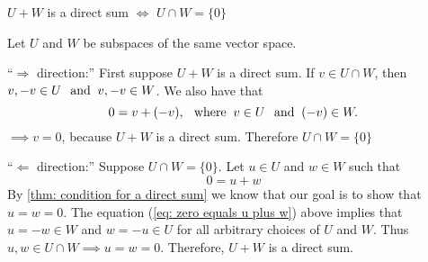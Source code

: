 \setcounter{thm}{45}
\begin{thm} 
  \label{thm: intersection of direct sum of two subscpaces}
  $U+W$ is a direct sum $\iff$ $U \cap W = \{0\}$
\end{thm}
\begin{prf} Let $U$ and $W$ be subspaces of the same vector space.
  \begin{description}
    \item{``$\Rightarrow$ direction:''} First suppose $U+W$ is a direct sum. If $v \in U \cap W$, then $v, -v \in U \;\;\, \text{and}\;\; v, -v \in W$. We also have that
    \begin{equation}
      0 = v + (-v), \;\;\, \text{where}\;\; v\in U \;\;\, \text{and}\;\; (-v) \in W.
    \end{equation}
    $\implies v=0$, because $U+W$  is a direct sum. Therefore $U \cap W = \{0\}$ 
    
    \item{``$\Leftarrow$ direction:''} Suppose $U\cap W = \{0\}$. Let  $u\in U$ and $w \in W$ such that
    \begin{equation}
      \label{eq: zero equals u plus w}
      0 = u+w
    \end{equation}
    By \ref{thm: condition for a direct sum} we know that our goal is to show that $u=w=0$. The equation (\ref{eq: zero equals u plus w}) above implies that $u=-w\in W$  and $w=-u \in U$ for all arbitrary choices of $U$ and $W$. Thus $u,w \in U\cap W \implies u=w=0.$ Therefore, $U+W$ is a direct sum.
  \end{description}
  \vspace{-1em}
\end{prf}
